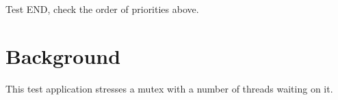 \begin{DoxyCode}
Test END, check the order of priorities above.
\end{DoxyCode}


\section*{Background }

This test application stresses a mutex with a number of threads waiting on it. 
